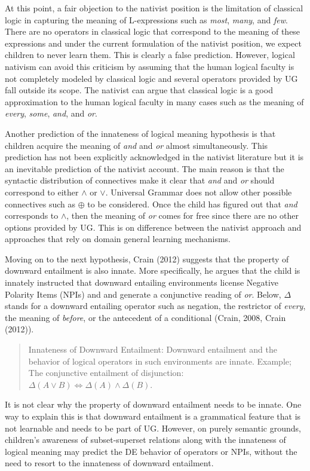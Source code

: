 \documentclass[oneside]{report}
\theoremstyle{definition}
\theoremstyle{definition}
\theoremstyle{definition}
\theoremstyle{remark}
\begin{document}
At this point, a fair objection to the nativist position is the
limitation of classical logic in capturing the meaning of L-expressions
such as \emph{most}, \emph{many}, and \emph{few}. There are no operators
in classical logic that correspond to the meaning of these expressions
and under the current formulation of the nativist position, we expect
children to never learn them. This is clearly a false prediction.
However, logical nativism can avoid this criticism by assuming that the
human logical faculty is not completely modeled by classical logic and
several operators provided by UG fall outside its scope. The nativist
can argue that classical logic is a good approximation to the human
logical faculty in many cases such as the meaning of \emph{every},
\emph{some}, \emph{and}, and \emph{or}.

Another prediction of the innateness of logical meaning hypothesis is
that children acquire the meaning of \emph{and} and \emph{or} almost
simultaneously. This prediction has not been explicitly acknowledged in
the nativist literature but it is an inevitable prediction of the
nativist account. The main reason is that the syntactic distribution of
connectives make it clear that \emph{and} and \emph{or} should
correspond to either \(\land\) or \(\lor\). Universal Grammar does not
allow other possible connectives such as \(\oplus\) to be considered.
Once the child has figured out that \emph{and} corresponds to \(\land\),
then the meaning of \emph{or} comes for free since there are no other
options provided by UG. This is on difference between the nativist
approach and approaches that rely on domain general learning mechanisms.

Moving on to the next hypothesis, Crain (2012) suggests that the
property of downward entailment is also innate. More specifically, he
argues that the child is innately instructed that downward entailing
environments license Negative Polarity Items (NPIs) and and generate a
conjunctive reading of \emph{or}. Below, \(\Delta\) stands for a
downward entailing operator such as negation, the restrictor of
\emph{every}, the meaning of \emph{before}, or the antecedent of a
conditional (Crain, 2008, Crain (2012)).
\begin{quote}
Innateness of Downward Entailment: Downward entailment and the behavior
of logical operators in such environments are innate. Example; The
conjunctive entailment of disjunction:
\(\Delta (A \lor B) \Leftrightarrow \Delta (A) \land \Delta (B)\).
\end{quote}
It is not clear why the property of downward entailment needs to be
innate. One way to explain this is that downward entailment is a
grammatical feature that is not learnable and needs to be part of UG.
However, on purely semantic grounds, children's awareness of
subset-superset relations along with the innateness of logical meaning
may predict the DE behavior of operators or NPIs, without the need to
resort to the innateness of downward entailment.
\end{document}
